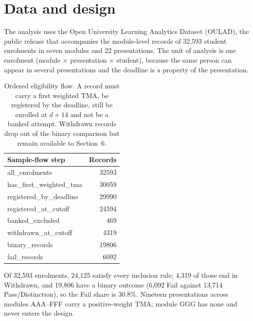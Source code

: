 \documentclass[11pt]{article}
\begin{document}
\section{Data and design}
The analysis uses the Open University Learning Analytics Dataset (OULAD), the public release that accompanies the module-level records of 32,593 student enrolments in seven modules and 22 presentations. The unit of analysis is one enrolment (module $\times$ presentation $\times$ student), because the same person can appear in several presentations and the deadline is a property of the presentation.
\begin{table}[t]
\centering
\small
\begin{tabular}{lr}
\toprule
Sample-flow step & Records \\
\midrule
all\_enrolments & 32593 \\
has\_first\_weighted\_tma & 30059 \\
registered\_by\_deadline & 29990 \\
registered\_at\_cutoff & 24594 \\
banked\_excluded & 469 \\
withdrawn\_at\_cutoff & 4319 \\
binary\_records & 19806 \\
fail\_records & 6092 \\
\bottomrule
\end{tabular}
\caption{Ordered eligibility flow. A record must carry a first weighted TMA, be registered by the deadline, still be enrolled at $d+14$ and not be a banked attempt. Withdrawn records drop out of the binary comparison but remain available to Section~6.}
\label{tab:flow}
\end{table}
Of 32,593 enrolments, 24,125 satisfy every inclusion rule; 4,319 of those end in Withdrawn, and 19,806 have a binary outcome (6,092 Fail against 13,714 Pass/Distinction), so the Fail share is 30.8\%. Nineteen presentations across modules AAA--FFF carry a positive-weight TMA; module GGG has none and never enters the design.
\end{document}
